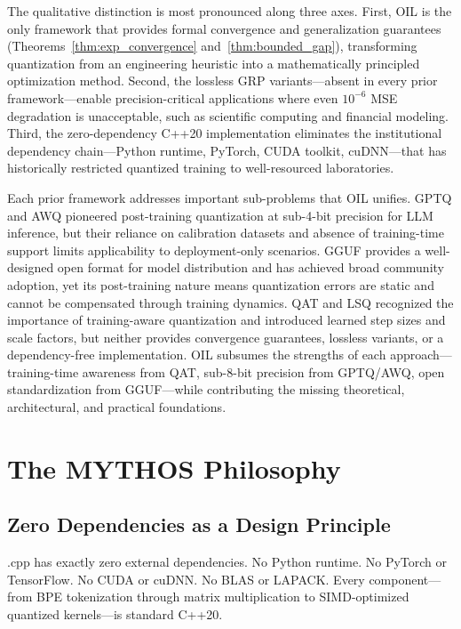 The qualitative distinction is most pronounced along three axes. First, OIL is the only framework that provides formal convergence and generalization guarantees (Theorems~\ref{thm:exp_convergence} and~\ref{thm:bounded_gap}), transforming quantization from an engineering heuristic into a mathematically principled optimization method. Second, the lossless GRP variants---absent in every prior framework---enable precision-critical applications where even $10^{-6}$ MSE degradation is unacceptable, such as scientific computing and financial modeling. Third, the zero-dependency C++20 implementation eliminates the institutional dependency chain---Python runtime, PyTorch, CUDA toolkit, cuDNN---that has historically restricted quantized training to well-resourced laboratories.

Each prior framework addresses important sub-problems that OIL unifies. GPTQ and AWQ pioneered post-training quantization at sub-4-bit precision for LLM inference, but their reliance on calibration datasets and absence of training-time support limits applicability to deployment-only scenarios. GGUF provides a well-designed open format for model distribution and has achieved broad community adoption, yet its post-training nature means quantization errors are static and cannot be compensated through training dynamics. QAT and LSQ recognized the importance of training-aware quantization and introduced learned step sizes and scale factors, but neither provides convergence guarantees, lossless variants, or a dependency-free implementation. OIL subsumes the strengths of each approach---training-time awareness from QAT, sub-8-bit precision from GPTQ/AWQ, open standardization from GGUF---while contributing the missing theoretical, architectural, and practical foundations.

\section{The MYTHOS Philosophy}
\label{sec:philosophy}

\subsection{Zero Dependencies as a Design Principle}

\MYTHOS{}.cpp has exactly zero external dependencies. No Python runtime. No PyTorch or TensorFlow. No CUDA or cuDNN. No BLAS or LAPACK. Every component---from BPE tokenization through matrix multiplication to SIMD-optimized quantized kernels---is standard C++20.

